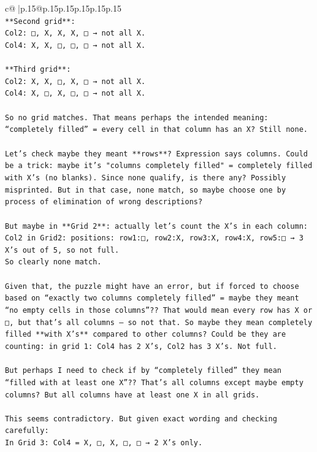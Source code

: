 \documentclass{article}
\begin{document}
{\begin{supertabular}{c@{$\;$}|p{.15\linewidth}@{}p{.15\linewidth}p{.15\linewidth}p{.15\linewidth}p{.15\linewidth}p{.15\linewidth}}
{{{\\ 
\texttt{**Second grid**:  } \\
\texttt{Col2: □, X, X, X, □ → not all X.  } \\
\texttt{Col4: X, X, □, □, □ → not all X.} \\
\\ 
\texttt{**Third grid**:  } \\
\texttt{Col2: X, X, □, X, □ → not all X.  } \\
\texttt{Col4: X, □, X, □, □ → not all X.} \\
\\ 
\texttt{So no grid matches. That means perhaps the intended meaning: “completely filled” = every cell in that column has an X? Still none.} \\
\\ 
\texttt{Let’s check maybe they meant **rows**? Expression says columns. Could be a trick: maybe it’s "columns completely filled" = completely filled with X’s (no blanks). Since none qualify, is there any? Possibly misprinted. But in that case, none match, so maybe choose one by process of elimination of wrong descriptions?  } \\
\\ 
\texttt{But maybe in **Grid 2**: actually let's count the X’s in each column:  } \\
\texttt{Col2 in Grid2: positions: row1:□, row2:X, row3:X, row4:X, row5:□ → 3 X’s out of 5, so not full.  } \\
\texttt{So clearly none match.} \\
\\ 
\texttt{Given that, the puzzle might have an error, but if forced to choose based on “exactly two columns completely filled” = maybe they meant “no empty cells in those columns”?? That would mean every row has X or □, but that’s all columns — so not that. So maybe they mean completely filled **with X’s** compared to other columns? Could be they are counting: in grid 1: Col4 has 2 X’s, Col2 has 3 X’s. Not full.} \\
\\ 
\texttt{But perhaps I need to check if by “completely filled” they mean “filled with at least one X”?? That’s all columns except maybe empty columns? But all columns have at least one X in all grids.} \\
\\ 
\texttt{This seems contradictory. But given exact wording and checking carefully:  } \\
\texttt{In Grid 3: Col4 = X, □, X, □, □ → 2 X’s only.  } \\
}}}
\end{supertabular}}
\end{document}
